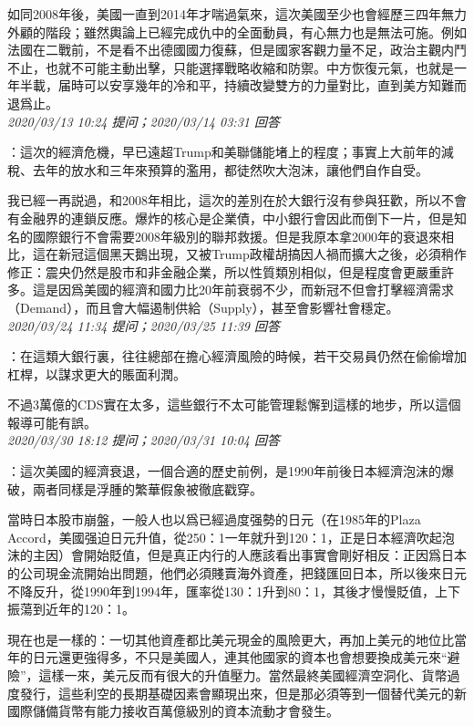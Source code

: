 \documentclass[twocolumn]{ctexart}
\begin{document}
如同2008年後，美國一直到2014年才喘過氣來，這次美國至少也會經歷三四年無力外顧的階段；雖然輿論上已經完成仇中的全面動員，有心無力也是無法可施。例如法國在二戰前，不是看不出德國國力復蘇，但是國家客觀力量不足，政治主觀内鬥不止，也就不可能主動出擊，只能選擇戰略收縮和防禦。中方恢復元氣，也就是一年半載，届時可以安享幾年的冷和平，持續改變雙方的力量對比，直到美方知難而退爲止。
\\

\textit{\hfill\noindent\small 2020/03/13 10:24 提问；2020/03/14 03:31 回答}

：這次的經濟危機，早已遠超Trump和美聯儲能堵上的程度；事實上大前年的減稅、去年的放水和三年來預算的濫用，都徒然吹大泡沫，讓他們自作自受。

我已經一再説過，和2008年相比，這次的差別在於大銀行沒有參與狂歡，所以不會有金融界的連鎖反應。爆炸的核心是企業債，中小銀行會因此而倒下一片，但是知名的國際銀行不會需要2008年級別的聯邦救援。但是我原本拿2000年的衰退來相比，這在新冠這個黑天鵝出現，又被Trump政權胡搞因人禍而擴大之後，必須稍作修正：震央仍然是股市和非金融企業，所以性質類別相似，但是程度會更嚴重許多。這是因爲美國的經濟和國力比20年前衰弱不少，而新冠不但會打擊經濟需求（Demand），而且會大幅遏制供給（Supply），甚至會影響社會穩定。
\\

\textit{\hfill\noindent\small 2020/03/24 11:34 提问；2020/03/25 11:39 回答}

：在這類大銀行裏，往往總部在擔心經濟風險的時候，若干交易員仍然在偷偷增加杠桿，以謀求更大的賬面利潤。

不過3萬億的CDS實在太多，這些銀行不太可能管理鬆懈到這樣的地步，所以這個報導可能有誤。
\\

\textit{\hfill\noindent\small 2020/03/30 18:12 提问；2020/03/31 10:04 回答}

：這次美國的經濟衰退，一個合適的歷史前例，是1990年前後日本經濟泡沫的爆破，兩者同樣是浮腫的繁華假象被徹底戳穿。

當時日本股市崩盤，一般人也以爲已經過度强勢的日元（在1985年的Plaza Accord，美國强迫日元升值，從250：1一年就升到120：1，正是日本經濟吹起泡沫的主因）會開始貶值，但是真正内行的人應該看出事實會剛好相反：正因爲日本的公司現金流開始出問題，他們必須賤賣海外資產，把錢匯回日本，所以後來日元不降反升，從1990年到1994年，匯率從130：1升到80：1，其後才慢慢貶值，上下振蕩到近年的120：1。

現在也是一樣的：一切其他資產都比美元現金的風險更大，再加上美元的地位比當年的日元還更強得多，不只是美國人，連其他國家的資本也會想要換成美元來“避險”，這樣一來，美元反而有很大的升值壓力。當然最終美國經濟空洞化、貨幣過度發行，這些利空的長期基礎因素會顯現出來，但是那必須等到一個替代美元的新國際儲備貨幣有能力接收百萬億級別的資本流動才會發生。
\\
\end{document}
